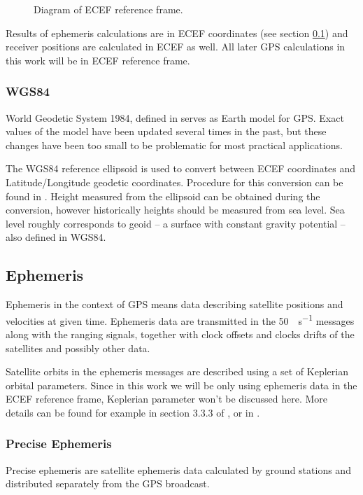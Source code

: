 \begin{figure}[h]
	\centering
	
	\caption{Diagram of ECEF reference frame.}
	\label{fig:ecef}
\end{figure}

Results of ephemeris calculations are in ECEF coordinates
(see section \ref{sec:gps-ephemeris}) and receiver positions are calculated
in ECEF as well.
All later GPS calculations in this work will be in ECEF reference frame.

\subsubsection{WGS84}
World Geodetic System 1984, defined in \cite{nima04}
serves as Earth model for GPS.
Exact values of the model have been updated several times in the past,
but these changes have been too small to be problematic for most practical
applications.

The WGS84 reference ellipsoid is used to convert between ECEF coordinates and
Latitude/Longitude geodetic coordinates.
Procedure for this conversion can be found in \cite{nima04}.
Height measured from the ellipsoid can be obtained during the conversion,
however historically heights should be measured from sea level.
Sea level roughly corresponds to geoid -- a surface with constant gravity
potential -- also defined in WGS84.



\subsection{Ephemeris}
\label{sec:gps-ephemeris}

Ephemeris in the context of GPS means data describing satellite positions and velocities
at given time.
Ephemeris data are transmitted in the \SI{50}{\bit\per\second} messages along with the ranging signals,
together with clock offsets and clocks drifts of the satellites
and possibly other data.

Satellite orbits in the ephemeris messages are described using a set of Keplerian orbital parameters.
Since in this work we will be only using ephemeris data in the ECEF reference frame, Keplerian parameter
won't be discussed here.
More details can be found for example in section 3.3.3 of \cite{rizos99}, or in \cite{kaplan06}.

\subsubsection{Precise Ephemeris}
Precise ephemeris are satellite ephemeris data calculated by ground stations
and distributed separately from the GPS broadcast.

